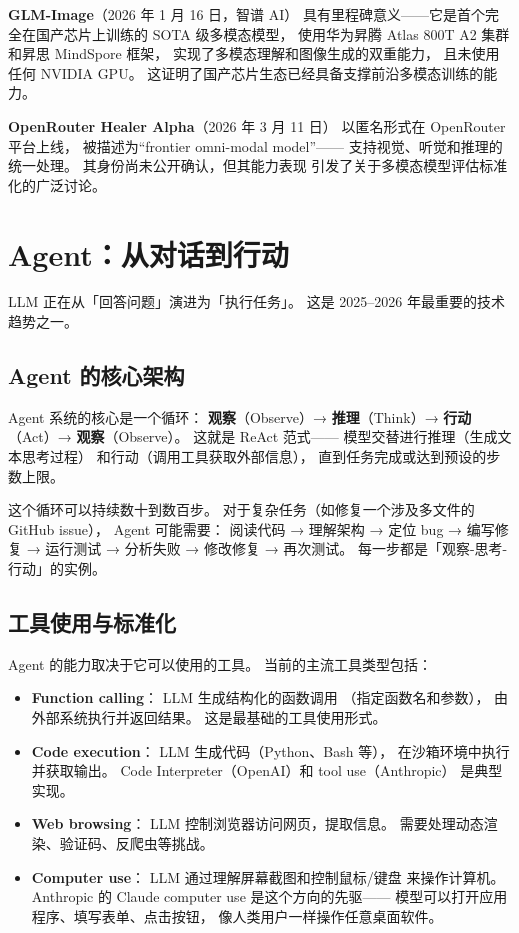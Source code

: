 \textbf{GLM-Image}（2026 年 1 月 16 日，智谱 AI）
具有里程碑意义——它是首个完全在国产芯片上训练的
SOTA 级多模态模型，
使用华为昇腾 Atlas 800T A2 集群和昇思 MindSpore 框架，
实现了多模态理解和图像生成的双重能力，
且未使用任何 NVIDIA GPU。
这证明了国产芯片生态已经具备支撑前沿多模态训练的能力。

\textbf{OpenRouter Healer Alpha}（2026 年 3 月 11 日）
以匿名形式在 OpenRouter 平台上线，
被描述为``frontier omni-modal model''——
支持视觉、听觉和推理的统一处理。
其身份尚未公开确认，但其能力表现
引发了关于多模态模型评估标准化的广泛讨论。

\section{Agent：从对话到行动}

LLM 正在从「回答问题」演进为「执行任务」。
这是 2025--2026 年最重要的技术趋势之一。

\subsection{Agent 的核心架构}

Agent 系统的核心是一个循环：
\textbf{观察}（Observe）→
\textbf{推理}（Think）→
\textbf{行动}（Act）→
\textbf{观察}（Observe）。
这就是 ReAct 范式——
模型交替进行推理（生成文本思考过程）
和行动（调用工具获取外部信息），
直到任务完成或达到预设的步数上限。

这个循环可以持续数十到数百步。
对于复杂任务（如修复一个涉及多文件的 GitHub issue），
Agent 可能需要：
阅读代码 → 理解架构 → 定位 bug →
编写修复 → 运行测试 → 分析失败 → 修改修复 → 再次测试。
每一步都是「观察-思考-行动」的实例。

\subsection{工具使用与标准化}

Agent 的能力取决于它可以使用的工具。
当前的主流工具类型包括：

\begin{itemize}[noitemsep]
  \item \textbf{Function calling}：
        LLM 生成结构化的函数调用
        （指定函数名和参数），
        由外部系统执行并返回结果。
        这是最基础的工具使用形式。
  \item \textbf{Code execution}：
        LLM 生成代码（Python、Bash 等），
        在沙箱环境中执行并获取输出。
        Code Interpreter（OpenAI）和 tool use（Anthropic）
        是典型实现。
  \item \textbf{Web browsing}：
        LLM 控制浏览器访问网页，提取信息。
        需要处理动态渲染、验证码、反爬虫等挑战。
  \item \textbf{Computer use}：
        LLM 通过理解屏幕截图和控制鼠标/键盘
        来操作计算机。
        Anthropic 的 Claude computer use 是这个方向的先驱——
        模型可以打开应用程序、填写表单、点击按钮，
        像人类用户一样操作任意桌面软件。
\end{itemize}

